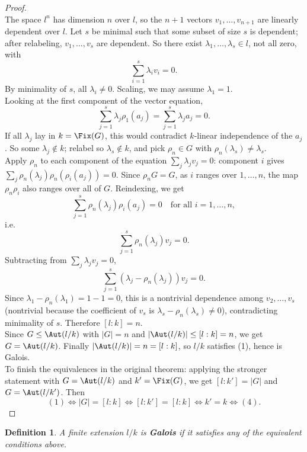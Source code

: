 \documentclass[a4paper,12pt]{article}
\newtheorem{defn}[thm]{Definition}
\begin{document}
\begin{proof}
\[    \]
    The space $l^n$ has dimension $n$ over $l$, so the $n+1$ vectors $v_1,\dots,v_{n+1}$ are linearly dependent over $l$. Let $s$ be minimal such that some subset of size $s$ is dependent; after relabeling, $v_1,\dots,v_s$ are dependent. So there exist $\lambda_1,\dots,\lambda_s\in l$, not all zero, with
    \[
    \sum_{i=1}^s\lambda_i v_i=0.
    \]
    By minimality of $s$, all $\lambda_i\neq 0$. Scaling, we may assume $\lambda_1=1$.\\
    Looking at the first component of the vector equation,
    \[
    \sum_{j=1}^s \lambda_j \rho_1(a_j)=\sum_{j=1}^s \lambda_j a_j=0. \tag{$*$}
    \]
    If all $\lambda_j$ lay in $k=\Fix(G)$, this would contradict $k$-linear independence of the $a_j$. So some $\lambda_j\notin k$; relabel so $\lambda_s\notin k$, and pick $\rho_n\in G$ with $\rho_n(\lambda_s)\neq \lambda_s$.\\
    Apply $\rho_n$ to each component of the equation $\sum_j \lambda_j v_j=0$: component $i$ gives $\sum_j \rho_n(\lambda_j)\rho_n(\rho_i(a_j))=0$. Since $\rho_n G=G$, as $i$ ranges over $1,\dots,n$, the map $\rho_n\rho_i$ also ranges over all of $G$. Reindexing, we get
    \[
    \sum_{j=1}^s\rho_n(\lambda_j)\rho_i(a_j)=0 \quad \text{for all } i=1,\dots,n,
    \]
    i.e.
    \[
    \sum_{j=1}^s\rho_n(\lambda_j)v_j=0.
    \]
    Subtracting from $\sum_j \lambda_j v_j=0$, 
    \[
    \sum_{j=1}^s(\lambda_j-\rho_n(\lambda_j))v_j=0.
    \]
    Since $\lambda_1-\rho_n(\lambda_1)=1-1=0$, this is a nontrivial dependence among $v_2,\dots,v_s$ (nontrivial because the coefficient of $v_s$ is $\lambda_s-\rho_n(\lambda_s)\neq 0$), contradicting minimality of $s$. Therefore $[l:k]=n$.\\
    Since $G\leq \Aut(l/k)$ with $|G|=n$ and $|\Aut(l/k)|\leq [l:k]=n$, we get $G=\Aut(l/k)$. Finally $|\Aut(l/k)|=n=[l:k]$, so $l/k$ satisfies (1), hence is Galois.\\
    To finish the equivalences in the original theorem: applying the stronger statement with $G=\Aut(l/k)$ and $k'=\Fix(G)$, we get $[l:k']=|G|$ and $G=\Aut(l/k')$. Then 
    \[
    (1)\iff |G|=[l:k]\iff [l:k']=[l:k]\iff k'=k\iff (4).
    \]
\end{proof}
\begin{defn}
    A finite extension $l/k$ is \textbf{Galois} if it satisfies any of the equivalent conditions above. 
\end{defn}
\end{document}
